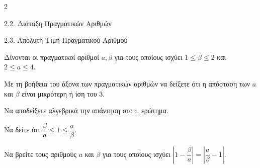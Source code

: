 \begin{ylh}{2}
    \item 2.2. Διάταξη Πραγματικών Αριθμών
    \item 2.3. Απόλυτη Τιμή Πραγματικού Αριθμού
\end{ylh}
Δίνονται οι πραγματικοί αριθμοί $a, \beta$ για τους οποίους ισχύει $1 \le \beta \le 2$ και $2 \le a \le 4$.
\begin{alist}
\item
\begin{rlist}
\item
  Με τη βοήθεια του άξονα των πραγματικών αριθμών να δείξετε ότι η απόσταση των $a$ και $\beta$ είναι μικρότερη ή ίση του 3.
\item Να αποδείξετε αλγεβρικά την απάντηση στο i. ερώτημα.

\end{rlist}
\item 
\begin{rlist}
\item Να δείτε ότι $\dfrac{\beta}{a} \le 1 \le \dfrac{a}{\beta}$.
\item Να βρείτε τους αριθμούς $a$ και $\beta$ για τους οποίους ισχύει $\left|1 - \dfrac{\beta}{a}\right| = \left|\dfrac{a}{\beta} - 1\right|$.
\end{rlist}
\end{alist}

